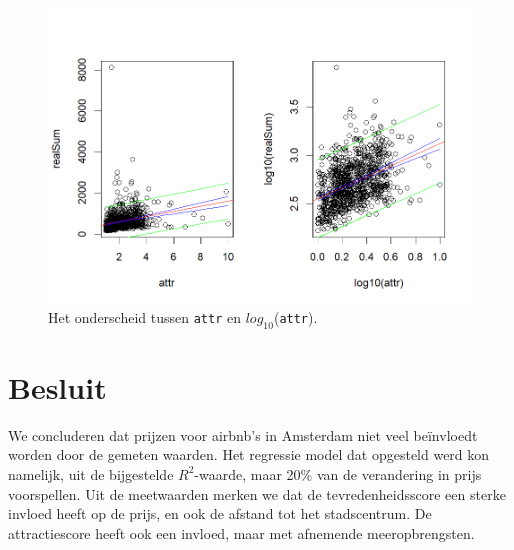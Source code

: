 \documentclass[a4paper]{kulakarticle}
\begin{document}
	\begin{figure}
		\centering
		\includegraphics[width=0.9\linewidth]{Figuren/betr.attr}
		\cprotect\caption{Het onderscheid tussen \verb*|attr| en $log_{10}$(\verb*|attr|).}
		\label{fig:betr}
	\end{figure}
	
	\section*{Besluit}
	We concluderen dat prijzen voor airbnb's in Amsterdam niet veel beïnvloedt worden door de gemeten waarden. Het regressie model dat opgesteld werd kon namelijk, uit de bijgestelde $R^2$-waarde, maar 20\% van de verandering in prijs voorspellen.
	Uit de meetwaarden merken we dat de tevredenheidsscore een sterke invloed heeft op de prijs, en ook de afstand tot het stadscentrum. De attractiescore heeft ook een invloed, maar met afnemende meeropbrengsten.
	
	
	
	
\end{document}
